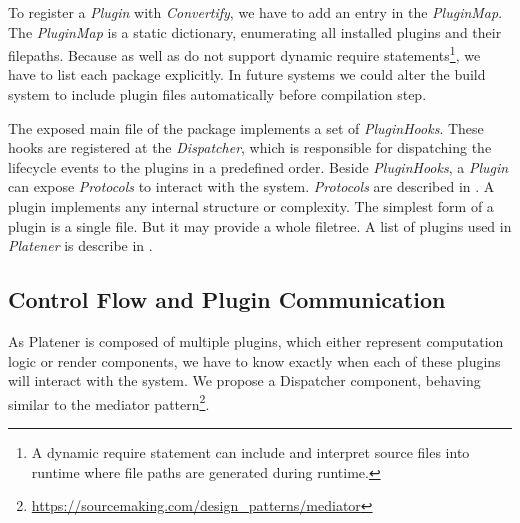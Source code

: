 \documentclass[../ClassicThesis.tex]{subfiles}
\begin{document}
To register a \emph{Plugin} with \emph{Convertify}, we have to add an entry in
the \emph{PluginMap}. The \emph{PluginMap} is a static dictionary, enumerating
all installed plugins and their filepaths. Because \emph{\nodejs} as well as
\emph{\essix} do not support dynamic require statements\footnote{A dynamic
  require statement can include and interpret source files into runtime where
  file paths are generated during runtime.}, we have to list each package
explicitly. In future systems we could alter the build system to include plugin
files automatically before compilation step.

The exposed main file of the package implements a set of \emph{PluginHooks}.
These hooks are registered at the \emph{Dispatcher}, which is responsible for
dispatching the lifecycle events to the plugins in a predefined order. Beside \emph{PluginHooks}, a \emph{Plugin} can expose
\emph{Protocols} to interact with the system. \emph{Protocols} are described in
. A plugin implements any internal structure or
complexity. The simplest form of a plugin is a single file. But it may provide a
whole filetree. A list of plugins used in \emph{Platener} is describe in
.





\subsection{Control Flow and Plugin Communication}

As Platener is composed of multiple plugins, which either represent computation
logic or render components, we have to know exactly when each of these plugins
will interact with the system. We propose a Dispatcher component, behaving
similar to the mediator
pattern\footnote{\url{https://sourcemaking.com/design_patterns/mediator}}.
\end{document}
